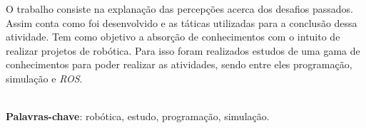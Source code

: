 \begin{thesisresumo}

    O trabalho consiste na explanação das percepções acerca dos desafios passados. Assim conta como foi desenvolvido e as táticas utilizadas para a conclusão dessa atividade. Tem como objetivo a absorção de  conhecimentos com o intuito de realizar projetos de robótica. Para isso foram realizados estudos de uma gama de conhecimentos para poder realizar as atividades, sendo entre eles programação, simulação e \textit{ROS}.


\ \\


\textbf{Palavras-chave}: robótica, estudo, programação, simulação.

\end{thesisresumo}
